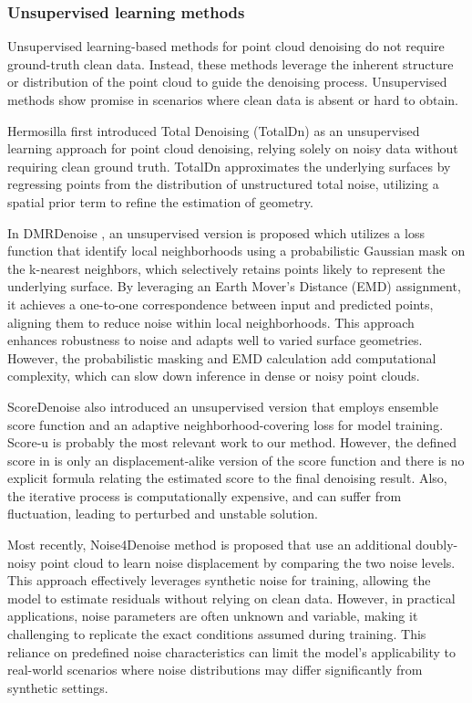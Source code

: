     \subsubsection{Unsupervised learning methods}
Unsupervised learning-based methods for point cloud denoising do not require ground-truth clean data. Instead, these methods leverage the inherent structure or distribution of the point cloud to guide the denoising process. Unsupervised methods show promise in scenarios where clean data is absent or hard to obtain.

Hermosilla \etal first introduced Total Denoising (TotalDn) \cite{hermosilla2019TotalDenoising} as an unsupervised learning approach for point cloud denoising, relying solely on noisy data without requiring clean ground truth. TotalDn approximates the underlying surfaces by regressing points from the distribution of unstructured total noise, utilizing a spatial prior term to refine the estimation of geometry. 

In DMRDenoise \cite{luo2020DMR}, an unsupervised version is proposed which utilizes a loss function that identify local neighborhoods using a probabilistic Gaussian mask on the k-nearest neighbors, which selectively retains points likely to represent the underlying surface. By leveraging an Earth Mover's Distance (EMD) assignment, it achieves a one-to-one correspondence between input and predicted points, aligning them to reduce noise within local neighborhoods.
This approach enhances robustness to noise and adapts well to varied surface geometries. However, the probabilistic masking and EMD calculation add computational complexity, which can slow down inference in dense or noisy point clouds. 

ScoreDenoise \cite{luo_score-based_2021} also introduced an unsupervised version that employs ensemble score function and an adaptive neighborhood-covering loss for model training.  
Score-u is probably the most relevant work to our method. However, the defined score in \cite{luo_score-based_2021} is only an displacement-alike version of the score function and there is no explicit formula relating the estimated score to the final denoising result. Also, the iterative process is computationally expensive, and can suffer from fluctuation, leading to perturbed and unstable solution.

Most recently, Noise4Denoise \cite{noise4Wang2024} method is proposed that use an additional doubly-noisy point cloud to learn noise displacement by comparing the two noise levels. This approach effectively leverages synthetic noise for training, allowing the model to estimate residuals without relying on clean data.
However, in practical applications, noise parameters are often unknown and variable, making it challenging to replicate the exact conditions assumed during training. This reliance on predefined noise characteristics can limit the model's applicability to real-world scenarios where noise distributions may differ significantly from synthetic settings. 
